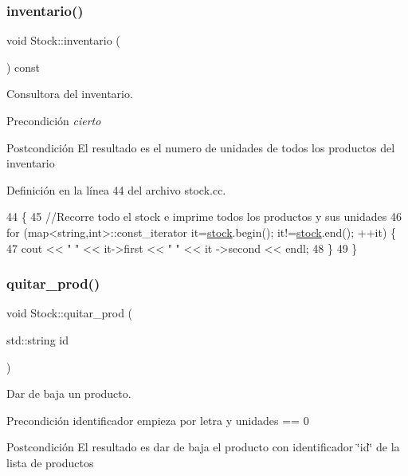 \subsubsection{\texorpdfstring{inventario()}{inventario()}}
{\footnotesize\ttfamily void Stock\+::inventario (\begin{DoxyParamCaption}{ }\end{DoxyParamCaption}) const}



Consultora del inventario. 

\begin{DoxyPrecond}{Precondición}
{\itshape cierto} 
\end{DoxyPrecond}
\begin{DoxyPostcond}{Postcondición}
El resultado es el numero de unidades de todos los productos del inventario 
\end{DoxyPostcond}


Definición en la línea 44 del archivo stock.\+cc.


\begin{DoxyCode}
44                             \{
45     \textcolor{comment}{//Recorre todo el stock e imprime todos los productos y sus unidades}
46     \textcolor{keywordflow}{for} (map<string,int>::const\_iterator it=\mbox{\hyperlink{class_stock_a55cb69748a14da5fe525e55a2c656ba9}{stock}}.begin(); it!=\mbox{\hyperlink{class_stock_a55cb69748a14da5fe525e55a2c656ba9}{stock}}.end(); ++it) \{
47         cout << \textcolor{stringliteral}{"  "} << it->first << \textcolor{stringliteral}{" "} << it ->second << endl;
48     \}
49 \}
\end{DoxyCode}
\mbox{\label{class_stock_aaa1564711f0e6aa0a8093f53a3dad0b4}} 
\subsubsection{\texorpdfstring{quitar\+\_\+prod()}{quitar\_prod()}}
{\footnotesize\ttfamily void Stock\+::quitar\+\_\+prod (\begin{DoxyParamCaption}\item[{std\+::string}]{id }\end{DoxyParamCaption})}



Dar de baja un producto. 

\begin{DoxyPrecond}{Precondición}
identificador empieza por letra y unidades == 0 
\end{DoxyPrecond}
\begin{DoxyPostcond}{Postcondición}
El resultado es dar de baja el producto con identificador \char`\"{}id\char`\"{} de la lista de productos 
\end{DoxyPostcond}


